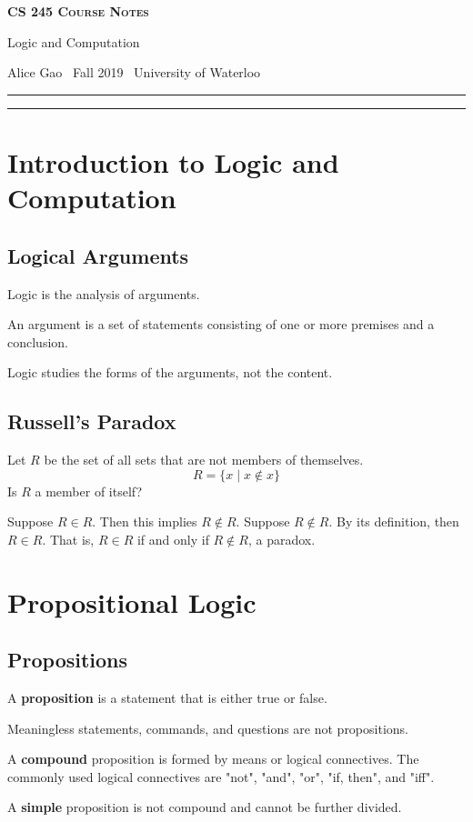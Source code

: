 \documentclass[11pt]{article}
\makeatletter
\theoremstyle{definition}
\newcommand{\newtitle}[4]{
  \begin{center}
	\huge{\textbf{\textsc{#1 Course Notes}}}
    
	\large{\sc #2}
    
	{\sc #3 \textbullet\, #4 \textbullet\, University of Waterloo}
	\normalsize\vspace{1cm}\hrule\vspace{0.5cm}
	
  \end{center}
}
\makeatother
\begin{document}
\newtitle{CS 245}{Logic and Computation}{Alice Gao}{Fall 2019}

\tableofcontents\thispagestyle{fancy}
\vspace{1cm}\hrule
\newpage
{}

\section{Introduction to Logic and Computation}

\subsection{Logical Arguments}
Logic is the analysis of arguments.

An argument is a set of statements consisting of one or more premises and a conclusion.

Logic studies the forms of the arguments, not the content.

\subsection{Russell's Paradox}
Let $R$ be the set of all sets that are not members of themselves.
$$R = \{x \mid x \notin x\}$$
Is $R$ a member of itself?

Suppose $R \in R$. Then this implies $R \notin R$. Suppose $R \notin R$. By its definition, then $R \in R$. That is, $R \in R$ if and only if $R \notin R$, a paradox.

\newpage
\section{Propositional Logic}

\subsection{Propositions}
A {\bf proposition} is a statement that is either true or false.

Meaningless statements, commands, and questions are not propositions.

A {\bf compound} proposition is formed by means or logical connectives. The commonly used logical connectives are "not", "and", "or", "if, then", and "iff".

A {\bf simple} proposition is not compound and cannot be further divided.
\end{document}
